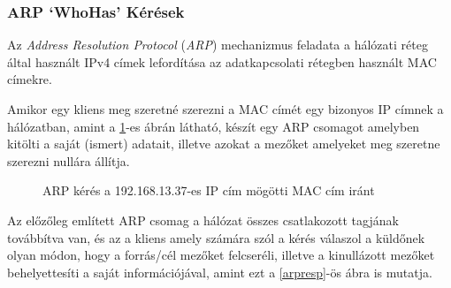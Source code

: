 \documentclass[a4paper,12pt]{article}
\begin{document}
\subsubsection{ARP `WhoHas' Kérések} \label{ssec:arpping}

	Az \textit{Address Resolution Protocol} (\textit{ARP}) mechanizmus feladata a hálózati réteg által használt IPv4 címek lefordítása az adatkapcsolati rétegben használt MAC címekre.
	
	Amikor egy kliens meg szeretné szerezni a MAC címét egy bizonyos IP címnek a hálózatban, amint a \ref{arpreq}-es ábrán látható, készít egy ARP csomagot amelyben kitölti a saját (ismert) adatait, illetve azokat a mezőket amelyeket meg szeretne szerezni nullára állítja.
	
	\begin{figure}[!htbp]
		\centering
		\caption{ARP kérés a 192.168.13.37-es IP cím mögötti MAC cím iránt}
		\label{arpreq}
	\end{figure}
	
	Az előzőleg említett ARP csomag a hálózat összes csatlakozott tagjának továbbítva van, és az a kliens amely számára szól a kérés válaszol a küldőnek olyan módon, hogy a forrás/cél mezőket felcseréli, illetve a kinullázott mezőket behelyettesíti a saját információjával, amint ezt a \ref{arpresp}-ös ábra is mutatja. 
	
\end{document}
